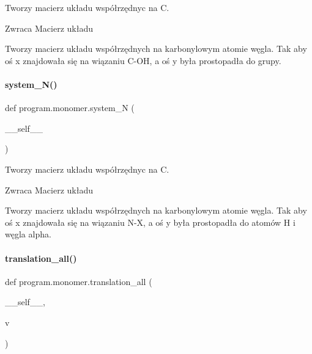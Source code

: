 Tworzy macierz układu współrzędnyc na C. 

\begin{DoxyReturn}{Zwraca}
Macierz układu \begin{DoxyVerb}Tworzy macierz układu współrzędnych na karbonylowym atomie węgla. Tak aby oś x znajdowała się
na wiązaniu C-OH, a oś y była prostopadła do grupy.
\end{DoxyVerb}
 
\end{DoxyReturn}
\mbox{\label{classprogram_1_1monomer_a1889e4f5eeb57a26cc29fb0372dea131}} 
\paragraph{system\+\_\+\+N()}
{\footnotesize\ttfamily def program.\+monomer.\+system\+\_\+N (\begin{DoxyParamCaption}\item[{}]{\+\_\+\+\_\+self\+\_\+\+\_\+ }\end{DoxyParamCaption})}



Tworzy macierz układu współrzędnyc na C. 

\begin{DoxyReturn}{Zwraca}
Macierz układu \begin{DoxyVerb}Tworzy macierz układu współrzędnych na karbonylowym atomie węgla. Tak aby oś x znajdowała się
na wiązaniu N-X, a oś y była prostopadła do atomów H i węgla alpha.
\end{DoxyVerb}
 
\end{DoxyReturn}
\mbox{\label{classprogram_1_1monomer_a0a1c5332ae16e0ce57bc81746800dafc}} 
\paragraph{translation\+\_\+all()}
{\footnotesize\ttfamily def program.\+monomer.\+translation\+\_\+all (\begin{DoxyParamCaption}\item[{}]{\+\_\+\+\_\+self\+\_\+\+\_\+,  }\item[{}]{v }\end{DoxyParamCaption})}




